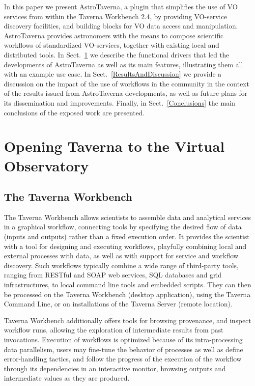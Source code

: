 \documentclass{aa}
\begin{document}
In this paper we present AstroTaverna, a plugin that simplifies the use of VO services from within the Taverna Workbench 2.4, by providing VO-service discovery facilities, and building blocks for VO data access and manipulation. AstroTaverna provides astronomers with the means to compose scientific workflows of standardized VO-services, together with existing local and distributed tools. In Sect.~\ref{Materials} we describe the functional drivers that led the developments of AstroTaverna as well as its main features, illustrating them all with an example use case. In Sect.~\ref{ResultsAndDiscussion} we provide a discussion on the impact of the use of workflows in the community in the context of the results issued from AstroTaverna developments, as well as future plans for its dissemination and improvements. Finally, in Sect.~\ref{Conclusions} the main conclusions of the exposed work are presented. 


\section{Opening Taverna to the Virtual Observatory}
\label{Materials}

\subsection{The Taverna Workbench}
\label{TavernaWorkbench}

The Taverna Workbench allows scientists to assemble data and analytical services in a graphical workflow, connecting tools by specifying the desired flow of data (inputs and outputs) rather than a fixed execution order. It provides the scientist with a tool for designing and executing workflows, playfully combining local and external processes with data, as well as with support for service and workflow discovery. Such workflows typically combine a wide range of third-party tools, ranging from RESTful and SOAP web services, SQL databases and grid infrastructures, to local command line tools and embedded scripts. They can then be processed on the Taverna Workbench (desktop application), using the Taverna Command Line, or on installations of the Taverna Server (remote location).

Taverna Workbench additionally offers tools for browsing provenance, and inspect workflow runs, allowing the exploration of intermediate results from past invocations. Execution of workflows is optimized because of its intra-processing data parallelism, users may fine-tune the behavior of processes as well as define error-handling tactics, and follow the progress of the execution of the workflow through its dependencies in an interactive monitor, browsing outputs and intermediate values as they are produced.
\end{document}
